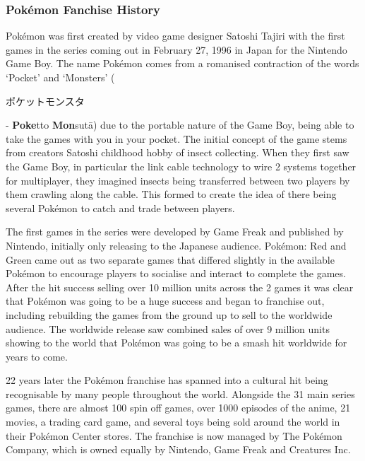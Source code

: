 \documentclass[a4paper]{article}
\newcommand{\Pokemon}{Pok\'{e}mon}
\begin{document}
\subsubsection{\Pokemon{} Fanchise History}
\par
\Pokemon{} was first created by video game designer Satoshi Tajiri with the first games in the series coming out in February 27, 1996 in Japan for the Nintendo Game Boy.
The name \Pokemon{} comes from a romanised contraction of the words `Pocket' and `Monsters' (\begin{CJK}{UTF8}{min}ポケットモンスタ\end{CJK} - \textbf{Poke}tto \textbf{Mon}sut\={a}) due to the portable nature of the Game Boy, being able to take the games with you in your pocket.
The initial concept of the game stems from creators Satoshi childhood hobby of insect collecting.
When they first saw the Game Boy, in particular the link cable technology to wire 2 systems together for multiplayer, they imagined insects being transferred between two players by them crawling along the cable.
This formed to create the idea of there being several \Pokemon{} to catch and trade between players.
\par
The first games in the series were developed by Game Freak and published by Nintendo, initially only releasing to the Japanese audience.
\Pokemon{}: Red and Green came out as two separate games that differed slightly in the available \Pokemon{} to encourage players to socialise and interact to complete the games.
After the hit success selling over 10 million units across the 2 games it was clear that \Pokemon{} was going to be a huge success and began to franchise out, including rebuilding the games from the ground up to sell to the worldwide audience.
The worldwide release saw combined sales of over 9 million units showing to the world that \Pokemon{} was going to be a smash hit worldwide for years to come.
\par
22 years later the \Pokemon{} franchise has spanned into a cultural hit being recognisable by many people throughout the world.
Alongside the 31 main series games, there are almost 100 spin off games, over 1000 episodes of the anime, 21 movies, a trading card game, and several toys being sold around the world in their \Pokemon{} Center stores.
The franchise is now managed by The \Pokemon{} Company, which is owned equally by Nintendo, Game Freak and Creatures Inc.
\end{document}
